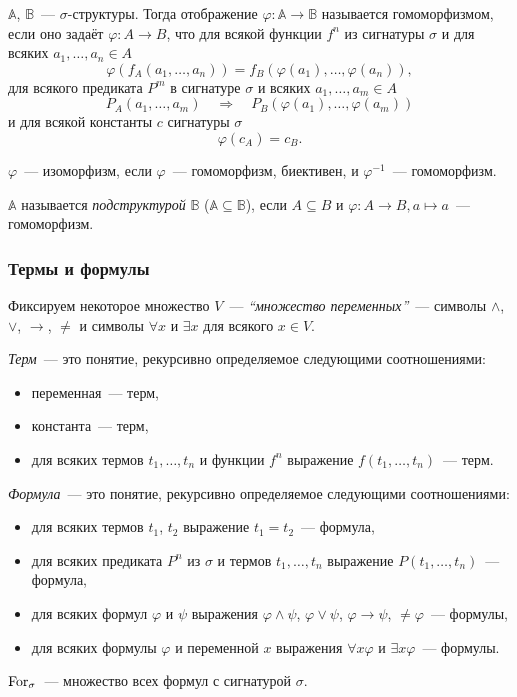 \documentclass[a4paper,11pt]{article}
\begin{document}
\begin{definition}
	$\mathbb{A}$, $\mathbb{B}$~— $\sigma$-структуры. Тогда отображение $\varphi: \mathbb{A} \to \mathbb{B}$ называется гомоморфизмом, если оно задаёт $\varphi: A \to B$, что для всякой функции $f^n$ из сигнатуры $\sigma$ и для всяких $a_1, \dots, a_n \in A$
	\[\varphi(f_A(a_1, \dots, a_n)) = f_B(\varphi(a_1), \dots, \varphi(a_n)),\]
	для всякого предиката $P^m$ в сигнатуре $\sigma$ и всяких $a_1, \dots, a_m \in A$
	\[P_A(a_1, \dots, a_m) \quad \Longrightarrow \quad P_B(\varphi(a_1), \dots, \varphi(a_m))\]
	и для всякой константы $c$ сигнатуры $\sigma$
	\[\varphi(c_A) = c_B.\]

	$\varphi$~— изоморфизм, если $\varphi$~— гомоморфизм, биективен, и $\varphi^{-1}$~— гомоморфизм.

	$\mathbb{A}$ называется \emph{подструктурой} $\mathbb{B}$ ($\mathbb{A} \subseteq \mathbb{B}$), если $A \subseteq B$ и $\varphi: A \to B, a \mapsto a$~— гомоморфизм.
\end{definition}

\subsubsection{Термы и формулы}

\begin{definition}
	Фиксируем некоторое множество $V$~— \emph{“множество переменных”}~— символы $\wedge$, $\vee$, $\to$, $\neq$ и символы $\forall x$ и $\exists x$ для всякого $x \in V$.
	
	\emph{Терм}~— это понятие, рекурсивно определяемое следующими соотношениями:
	\begin{itemize}
		\item переменная~— терм,
		\item константа~— терм,
		\item для всяких термов $t_1, \dots, t_n$ и функции $f^n$ выражение $f(t_1, \dots, t_n)$~— терм.
	\end{itemize}

	\emph{Формула}~— это понятие, рекурсивно определяемое следующими соотношениями:
	\begin{itemize}
		\item для всяких термов $t_1$, $t_2$ выражение $t_1 = t_2$~— формула,
		\item для всяких предиката $P^n$ из $\sigma$ и термов $t_1, \dots, t_n$ выражение $P(t_1, \dots, t_n)$~— формула,
		\item для всяких формул $\varphi$ и $\psi$ выражения $\varphi \wedge \psi$, $\varphi \vee \psi$, $\varphi \to \psi$, $\neq \varphi$~— формулы,
		\item для всяких формулы $\varphi$ и переменной $x$ выражения $\forall x \varphi$ и $\exists x \varphi$~— формулы.
	\end{itemize}
	$\operatorname{For}_\sigma$~— множество всех формул с сигнатурой $\sigma$.
\end{definition}
\end{document}
